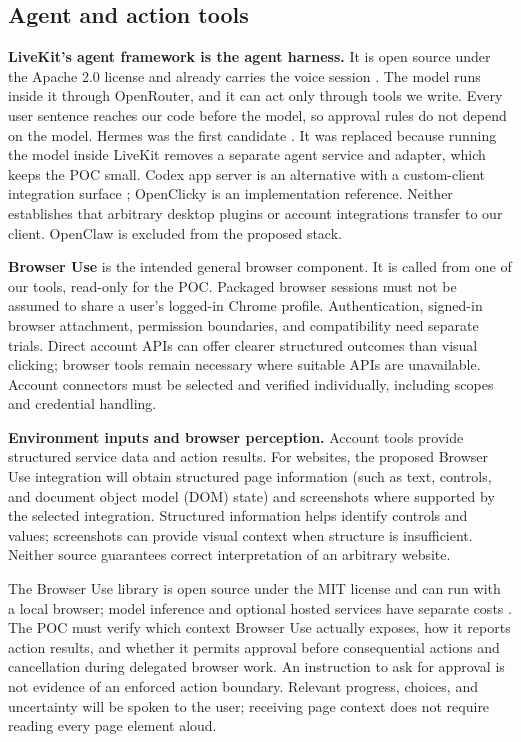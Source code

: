 \documentclass[11pt]{article}
\begin{document}
\subsection{Agent and action tools}
\textbf{LiveKit's agent framework is the agent harness.} It is open source under
the Apache 2.0 license and already carries the voice session \citep{LiveKitTools}.
The model runs inside it through OpenRouter, and it can act only through tools we
write. Every user sentence reaches our code before the model, so approval rules
do not depend on the model. Hermes was the first candidate \citep{HermesIntegration}.
It was replaced because running the model inside LiveKit removes a separate agent
service and adapter, which keeps the POC small. Codex app server is an alternative with a custom-client integration surface
\citep{CodexServer}; OpenClicky is an implementation reference. Neither establishes
that arbitrary desktop plugins or account integrations transfer to our client.
OpenClaw is excluded from the proposed stack.

\textbf{Browser Use} is the intended general browser component. It is called
from one of our tools, read-only for the POC. Packaged browser sessions must not be assumed to share a
user's logged-in Chrome profile. Authentication, signed-in browser attachment,
permission boundaries, and compatibility need separate trials. Direct account
APIs can offer clearer structured outcomes than visual clicking; browser tools
remain necessary where suitable APIs are unavailable. Account connectors must
be selected and verified individually, including scopes and credential handling.

\textbf{Environment inputs and browser perception.} Account tools provide
structured service data and action results. For websites, the proposed Browser
Use integration will obtain structured page information (such as text, controls,
and document object model (DOM) state) and screenshots where supported by the
selected integration. Structured information helps identify controls and values;
screenshots can provide visual context when structure is insufficient. Neither
source guarantees correct interpretation of an arbitrary website.

The Browser Use library is open source under the MIT license and can run with a
local browser; model inference and optional hosted services have separate costs
\citep{BrowserUseSource}. The POC must verify which context Browser Use
actually exposes, how it reports action results, and whether it permits approval
before consequential actions and cancellation during delegated browser work.
An instruction to ask for approval is not evidence of an enforced action boundary.
Relevant progress, choices, and uncertainty will be spoken to the user; receiving
page context does not require reading every page element aloud.
\end{document}

